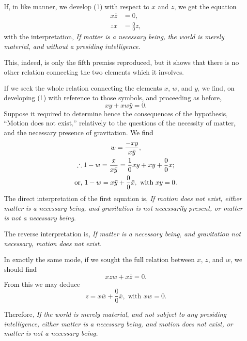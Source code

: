 \documentclass[oneside]{book}
\begin{document}
If, in like manner, we develop (1) with respect to $x$ and $z$,
we get the equation
\begin{align*}
x\bar{z} &= 0,
\\
\therefore x &= \frac{0}{0}z,
\end{align*}
with the interpretation, \emph{If matter is a necessary being, the world
is merely material, and without a presiding intelligence.}

This, indeed, is only the fifth premiss reproduced, but it
shows that there is no other relation connecting the two elements
which it involves.

If we seek the whole relation connecting the elements $x$, $w$,
and $y$, we find, on developing (1) with reference to those symbols,
and proceeding as before,
\begin{equation*}
xy + xw\bar{y} = 0.
\end{equation*}
Suppose it required to determine hence the consequences of the
hypothesis, ``Motion does not exist,'' relatively to the questions
of the necessity of matter, and the necessary presence of gravitation.
We find
\begin{gather*}
w=\frac{-xy}{x\bar{y}},
\\
\therefore 1-w=\frac{x}{x\bar{y}} =\frac{1}{0}xy+x\bar{y}+\frac{0}{0}\bar{x};
\\
\text{or, } \hfill
1-w=x\bar{y}+\frac{0}{0}\bar{x},\text{ with }xy=0.
\hfill
\end{gather*}
The direct interpretation of the first equation is, \textit{If motion does
not exist, either matter is a necessary being, and gravitation is not
necessarily present, or matter is not a necessary being}.

The reverse interpretation is, \textit{If matter is a necessary being,
and gravitation not necessary, motion does not exist}.

In exactly the same mode, if we sought the full relation between
$x$, $z$, and $w$, we should find
\begin{equation*}
xzw + x\bar{z} = 0.
\end{equation*}
From this we may deduce
\begin{equation*}
z=x\bar{w}+\frac{0}{0}\bar{x},\text{ with }xw=0.
\end{equation*}

Therefore, \textit{If the world is merely material, and not subject to
any presiding intelligence, either matter is a necessary being, and
motion does not exist, or matter is not a necessary being.}
\end{document}
